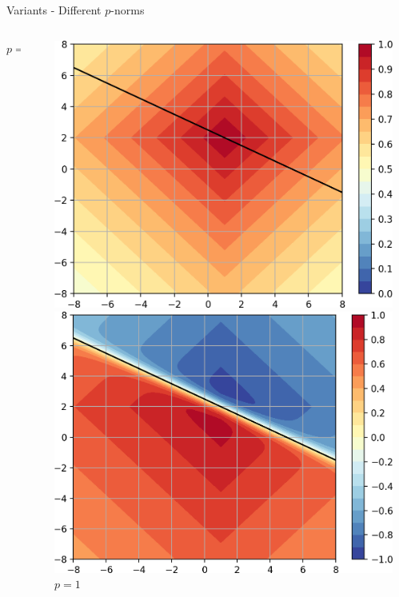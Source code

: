 \documentclass{beamer}
\begin{document}
\begin{frame}{Variants - Different $p$-norms}
\begin{columns}
\begin{column}{.27\textwidth}
            \centering $p=0.5$
    \end{column} \\
    \hspace{0.1cm}
    \begin{column}{.27\textwidth}
            \includegraphics[width=\textwidth]{images/Variants-Norms/ord1_g-cropped.png}\\
            \includegraphics[width=\textwidth]{images/Variants-Norms/ord1-cropped.png}\\
            \centering $p=1$
    \end{column} \\
    \hspace{0.1cm}

\end{columns}
\end{frame}
\end{document}
